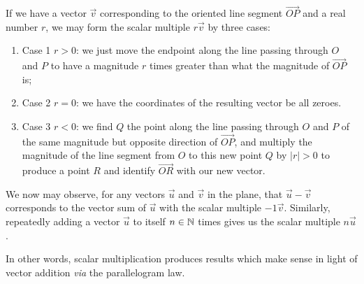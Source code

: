 If we have a vector $\vec{v}$ corresponding to the oriented line segment
$\overrightarrow{OP}$ and a real number $r$, we may form the
scalar multiple $r\vec{v}$ by three cases:
\begin{enumerate}
\item Case 1 $r>0$: we just move the endpoint along the line passing
  through $O$ and $P$ to have a magnitude $r$ times greater than what
  the magnitude of $\overrightarrow{OP}$ is;
\item Case 2 $r=0$: we have the coordinates of the resulting vector be
  all zeroes.
\item Case 3 $r<0$: we find $Q$ the point along the line passing
  through $O$ and $P$ of the same magnitude but opposite direction of
  $\overrightarrow{OP}$, and multiply the magnitude of the line segment
  from $O$ to this new point $Q$ by $|r|>0$ to produce a point $R$ and
  identify $\overrightarrow{OR}$ with our new vector.
\end{enumerate}

We now may observe, for any vectors $\vec{u}$ and $\vec{v}$ in the
plane, that $\vec{u}-\vec{v}$ corresponds to the vector sum of $\vec{u}$
with the scalar multiple $-1\vec{v}$. Similarly, repeatedly adding a
vector $\vec{u}$ to itself $n\in\mathbb{N}$ times gives us the scalar multiple
$n\vec{u}$.

In other words, scalar multiplication produces results which make sense
in light of vector addition \emph{via} the parallelogram law.

